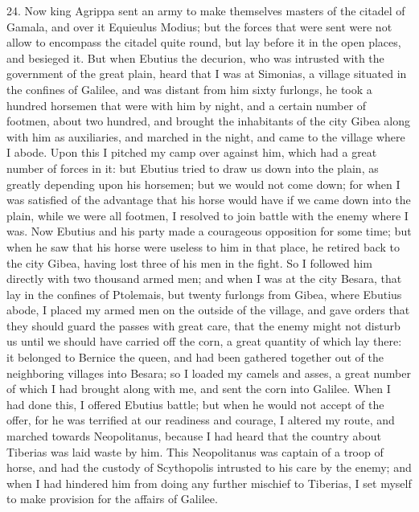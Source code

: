 24. Now king Agrippa sent an army to make themselves masters of the
citadel of Gamala, and over it Equieulus Modius; but the forces that were
sent were not allow to encompass the citadel quite round, but lay before
it in the open places, and besieged it. But when Ebutius the decurion, who
was intrusted with the government of the great plain, heard that I was at
Simonias, a village situated in the confines of Galilee, and was distant
from him sixty furlongs, he took a hundred horsemen that were with him by
night, and a certain number of footmen, about two hundred, and brought the
inhabitants of the city Gibea along with him as auxiliaries, and marched
in the night, and came to the village where I abode. Upon this I pitched
my camp over against him, which had a great number of forces in it: but
Ebutius tried to draw us down into the plain, as greatly depending upon
his horsemen; but we would not come down; for when I was satisfied of the
advantage that his horse would have if we came down into the plain, while
we were all footmen, I resolved to join battle with the enemy where I was.
Now Ebutius and his party made a courageous opposition for some time; but
when he saw that his horse were useless to him in that place, he retired
back to the city Gibea, having lost three of his men in the fight. So I
followed him directly with two thousand armed men; and when I was at the
city Besara, that lay in the confines of Ptolemais, but twenty furlongs
from Gibea, where Ebutius abode, I placed my armed men on the outside of
the village, and gave orders that they should guard the passes with great
care, that the enemy might not disturb us until we should have carried off
the corn, a great quantity of which lay there: it belonged to Bernice the
queen, and had been gathered together out of the neighboring villages into
Besara; so I loaded my camels and asses, a great number of which I had
brought along with me, and sent the corn into Galilee. When I had done
this, I offered Ebutius battle; but when he would not accept of the offer,
for he was terrified at our readiness and courage, I altered my route, and
marched towards Neopolitanus, because I had heard that the country about
Tiberias was laid waste by him. This Neopolitanus was captain of a troop
of horse, and had the custody of Scythopolis intrusted to his care by the
enemy; and when I had hindered him from doing any further mischief to
Tiberias, I set myself to make provision for the affairs of Galilee.

